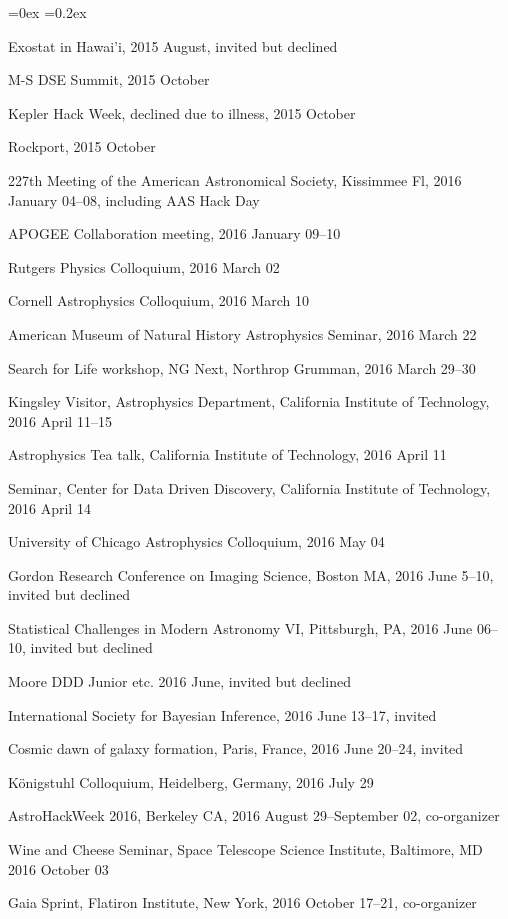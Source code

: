 \documentclass[12pt,letterpaper]{article}
\newcounter{refpubnum}
\newcommand{\hogglist}{%
    \rightmargin=0in
    \leftmargin=0.18in
    \topsep=0ex
    \partopsep=0pt
    \itemsep=0.2ex
    \parsep=0pt
    \itemindent=-1.0\leftmargin
    \listparindent=0.0\leftmargin
    \settowidth{\labelsep}{~}
    \usecounter{refpubnum}
  }
\begin{document}
\begin{list}{}{\hogglist}
{\item Exostat in Hawai'i, 2015 August, invited but declined
\item M-S DSE Summit, 2015 October
\item Kepler Hack Week, declined due to illness, 2015 October
\item Rockport, 2015 October
\item 227th Meeting of the American Astronomical Society, Kissimmee Fl, 2016 January 04--08, including AAS Hack Day
\item APOGEE Collaboration meeting, 2016 January 09--10
\item Rutgers Physics Colloquium, 2016 March 02
\item Cornell Astrophysics Colloquium, 2016 March 10
\item American Museum of Natural History Astrophysics Seminar, 2016 March 22
\item Search for Life workshop, NG Next, Northrop Grumman, 2016 March 29--30
\item Kingsley Visitor, Astrophysics Department, California Institute of Technology, 2016 April 11--15
\item Astrophysics Tea talk, California Institute of Technology, 2016 April 11
\item Seminar, Center for Data Driven Discovery, California Institute of Technology, 2016 April 14
\item University of Chicago Astrophysics Colloquium, 2016 May 04
\item Gordon Research Conference on Imaging Science, Boston MA, 2016 June 5--10, invited but declined
\item Statistical Challenges in Modern Astronomy VI, Pittsburgh, PA, 2016 June 06--10, invited but declined
\item Moore DDD Junior etc. 2016 June, invited but declined
\item International Society for Bayesian Inference, 2016 June 13--17, invited
\item Cosmic dawn of galaxy formation, Paris, France, 2016 June 20--24, invited
\item K\"onigstuhl Colloquium, Heidelberg, Germany, 2016 July 29
\item AstroHackWeek 2016, Berkeley CA, 2016 August 29--September 02, co-organizer
\item Wine and Cheese Seminar, Space Telescope Science Institute, Baltimore, MD 2016 October 03
\item Gaia Sprint, Flatiron Institute, New York, 2016 October 17--21, co-organizer
}
\end{list}
\end{document}
